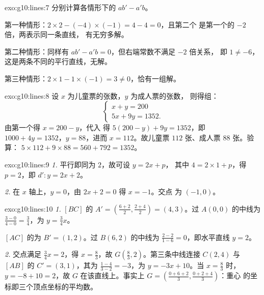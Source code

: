 \begin{solution}{exo:g10:lines:7}
分别计算各情形下的 $ab' - a'b$。

第一种情形：$2 \times 2 - (-4) \times (-1) = 4 - 4 = 0$，且第二个
是第一个的 $-2$ 倍，两表示同一条直线，
有无穷多解。

第二种情形：同样有 $ab' - a'b = 0$，但右端常数不满足 $-2$ 倍关系，
即 $1 \neq -6$，这是两条不同的平行直线，无解。

第三种情形：$2 \times 1 - 1 \times (-1) = 3 \neq 0$，恰有一组解。
\end{solution}

\begin{solution}{exo:g10:lines:8}
设 $x$ 为儿童票的张数，$y$ 为成人票的张数，
则得组：
\[
\begin{cases}
x + y = 200 \\
5x + 9y = 1352 .
\end{cases}
\]
由第一个得 $x = 200 - y$，代入
得 $5(200 - y) + 9y = 1352$，即 $1000 + 4y = 1352$，$y = 88$，进而
$x = 112$。故儿童票 $112$ 张、成人票 $88$ 张。验算：
$5 \times 112 + 9 \times 88 = 560 + 792 = 1352$。
\end{solution}

\begin{solution}{exo:g10:lines:9}
\emph{1.} 平行即同为 $2$，故可设 $y = 2x + p$，
其中 $4 = 2 \times 1 + p$，得 $p = 2$，即 $d'\colon y = 2x + 2$。

\emph{2.} 在 $x$ 轴上，$y = 0$，由 $2x + 2 = 0$ 得 $x = -1$。交点
为 $(-1, 0)$。
\end{solution}

\begin{solution}{exo:g10:lines:10}
\emph{1.} $[BC]$ 的 $A' = \left(\frac{6+2}{2},
\frac{2+4}{2}\right) = (4, 3)$。过 $A(0,0)$ 的中线为
$\frac{3 - 0}{4 - 0} = \frac34$，为 $y = \frac34 x$。

$[AC]$ 的为 $B' = (1, 2)$。过 $B(6, 2)$ 的中线为
$\frac{2 - 2}{1 - 6} = 0$，即水平直线 $y = 2$。

\emph{2.} 交点满足 $\frac34 x = 2$，得 $x = \frac83$，故
$G\left(\frac83, 2\right)$。第三条中线连接 $C(2,4)$ 与
$[AB]$ 的 $C' = (3, 1)$，其为
$\frac{1 - 4}{3 - 2} = -3$，为 $y = -3x + 10$。当 $x = \frac83$ 时，
$y = -8 + 10 = 2$，故 $G$ 在该直线上。事实上
$G = \left(\frac{0 + 6 + 2}{3}, \frac{0 + 2 + 4}{3}\right)$：重心
的坐标即三个顶点坐标的平均数。
\end{solution}

